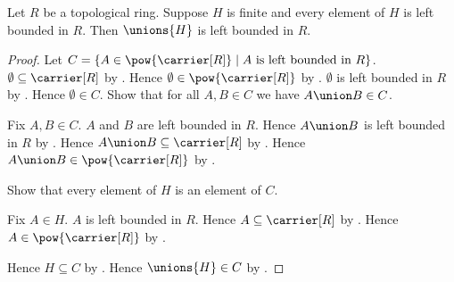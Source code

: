 \begin{theorem}\label{finite_union_left_bounded}
    Let $R$ be a topological ring.
    Suppose $H$ is finite and every element of $H$ is left bounded in $R$.
    Then $\unions{H}$ is left bounded in $R$.
\end{theorem}
\begin{proof}
    Let $C=\{A\in\pow{\carrier[R]}\mid
        \text{$A$ is left bounded in $R$}\}$.
    $\emptyset\subseteq\carrier[R]$ by .
    Hence $\emptyset\in\pow{\carrier[R]}$ by .
    $\emptyset$ is left bounded in $R$ by .
    Hence $\emptyset\in C$.
    Show that for all $A,B\in C$ we have $A\union B\in C$.
    \begin{subproof}
        Fix $A,B\in C$.
        $A$ and $B$ are left bounded in $R$.
        Hence $A\union B$ is left bounded in $R$ by
            .
        Hence $A\union B\subseteq\carrier[R]$ by
            .
        Hence $A\union B\in\pow{\carrier[R]}$ by .
    \end{subproof}
    Show that every element of $H$ is an element of $C$.
    \begin{subproof}
        Fix $A\in H$.
        $A$ is left bounded in $R$.
        Hence $A\subseteq\carrier[R]$ by .
        Hence $A\in\pow{\carrier[R]}$ by .
    \end{subproof}
    Hence $H\subseteq C$ by .
    Hence $\unions{H}\in C$ by
        .
\end{proof}

